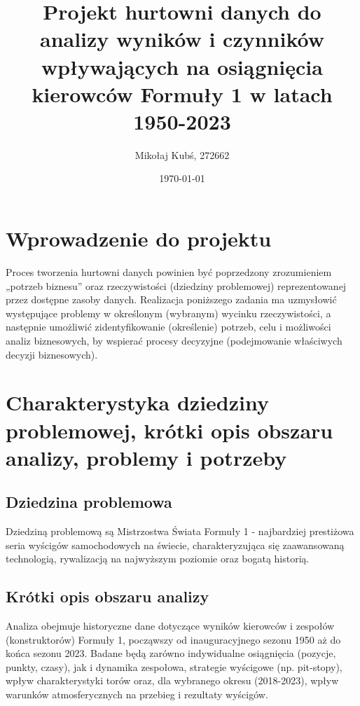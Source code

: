 \documentclass[a4paper,12pt]{article}
\title{Projekt hurtowni danych do analizy wyników i czynników wpływających na osiągnięcia kierowców Formuły 1 w latach 1950-2023}
\author{Mikołaj Kubś, 272662}
\date{\today}
\begin{document}
\maketitle
\tableofcontents
\newpage

\section{Wprowadzenie do projektu}
Proces tworzenia hurtowni danych powinien być poprzedzony zrozumieniem „potrzeb biznesu” oraz rzeczywistości (dziedziny problemowej) reprezentowanej przez dostępne zasoby danych. Realizacja poniższego zadania ma uzmysłowić występujące problemy w określonym (wybranym) wycinku rzeczywistości, a następnie umożliwić zidentyfikowanie (określenie) potrzeb, celu i możliwości analiz biznesowych, by wspierać procesy decyzyjne (podejmowanie właściwych decyzji biznesowych).

\section{Charakterystyka dziedziny problemowej, krótki opis obszaru analizy, problemy i potrzeby}

\subsection{Dziedzina problemowa}
Dziedziną problemową są Mistrzostwa Świata Formuły 1 - najbardziej prestiżowa seria wyścigów samochodowych na świecie, charakteryzująca się zaawansowaną technologią, rywalizacją na najwyższym poziomie oraz bogatą historią.

\subsection{Krótki opis obszaru analizy}
Analiza obejmuje historyczne dane dotyczące wyników kierowców i zespołów (konstruktorów) Formuły 1, począwszy od inauguracyjnego sezonu 1950 aż do końca sezonu 2023. Badane będą zarówno indywidualne osiągnięcia (pozycje, punkty, czasy), jak i dynamika zespołowa, strategie wyścigowe (np. pit-stopy), wpływ charakterystyki torów oraz, dla wybranego okresu (2018-2023), wpływ warunków atmosferycznych na przebieg i rezultaty wyścigów.
\end{document}

